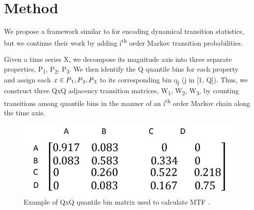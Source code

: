 \documentclass{turabian-thesis}[12pt]
\begin{document}


\section{Method}

We propose a framework similar to \cite{wang_encoding_nodate}  for encoding dynamical transition statistics, but we continue their work by adding i\textsuperscript{th} order Markov transition probabilities.

Given a time series X, we decompose its magnitude axis into three separate properties, P\textsubscript{1},  P\textsubscript{2},  P\textsubscript{3}. We then identify the Q quantile bins for each property  and assign each $x \in P\textsubscript{1},  P\textsubscript{2},  P\textsubscript{3}$ to its corresponding bin q\textsubscript{j} (j in [1, Q]). Thus, we construct three QxQ adjacency transition matrices, W\textsubscript{1}, W\textsubscript{2}, W\textsubscript{3}, by counting transitions among quantile bins in the manner of an i\textsuperscript{th} order Markov chain along the time axis.

\begin{figure}[h!]
   \begin{center}
      \includegraphics[scale=0.6]{../media/mtf_q.png}
   \end{center}
   \caption{Example of QxQ quantile bin matrix used to calculate MTF \cite{wang_encoding_nodate}.}
   \label{fig:mtf_q}
\end{figure}
 
\end{document}
